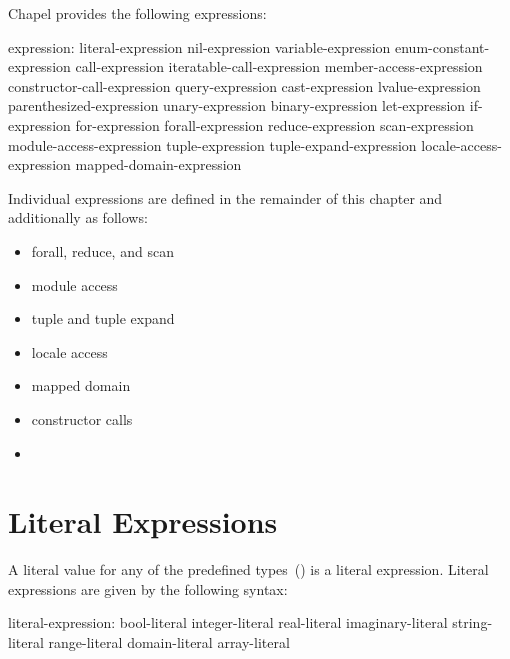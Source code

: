 \label{Expressions}

Chapel provides the following expressions:

\begin{syntax}
expression:
  literal-expression
  nil-expression
  variable-expression
  enum-constant-expression
  call-expression
  iteratable-call-expression
  member-access-expression
  constructor-call-expression
  query-expression
  cast-expression
  lvalue-expression
  parenthesized-expression
  unary-expression
  binary-expression
  let-expression
  if-expression
  for-expression
  forall-expression
  reduce-expression
  scan-expression
  module-access-expression
  tuple-expression
  tuple-expand-expression
  locale-access-expression
  mapped-domain-expression
\end{syntax}

Individual expressions are defined in the remainder of this chapter
and additionally as follows:

\begin{itemize}
\item forall, reduce, and scan 
\item module access 
\item tuple and tuple expand 
\item locale access 
\item mapped domain 
\item constructor calls 
\item {} 
\end{itemize}

\section{Literal Expressions}
\label{Literal_Expressions}

A literal value for any of the predefined
types~() is a literal expression.
Literal expressions are given by the following syntax:
\begin{syntax}
literal-expression:
  bool-literal
  integer-literal
  real-literal
  imaginary-literal
  string-literal
  range-literal
  domain-literal
  array-literal
\end{syntax}

